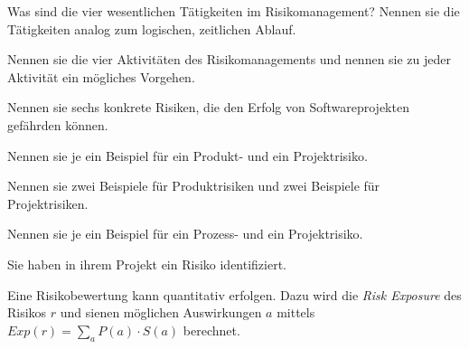 \documentclass[12pt]{exam}
\begin{document}
\begin{questions}
\question[5] Was sind die vier wesentlichen Tätigkeiten im Risikomanagement? Nennen sie die Tätigkeiten analog zum logischen, zeitlichen Ablauf.
\addpoints

\question[6] Nennen sie die vier Aktivitäten des Risikomanagements und nennen sie zu jeder Aktivität ein mögliches Vorgehen.
\addpoints

\question[3] Nennen sie sechs konkrete Risiken, die den Erfolg von Softwareprojekten gefährden können.
\addpoints

\question[2] Nennen sie je ein Beispiel für ein Produkt- und ein Projektrisiko.
\addpoints

\question[4] Nennen sie zwei Beispiele für Produktrisiken und zwei Beispiele für Projektrisiken.
\addpoints

\question[2] Nennen sie je ein Beispiel für ein Prozess- und ein Projektrisiko.
\addpoints

\question[4] Sie haben in ihrem Projekt ein Risiko identifiziert.
\noaddpoints
{}

\question[10] Eine Risikobewertung kann quantitativ erfolgen. Dazu wird die \emph{Risk Exposure} des Risikos $r$ und sienen möglichen Auswirkungen $a$ mittels $Exp(r) = \sum_aP(a) \cdot S(a)$ berechnet.
\noaddpoints
{}
\end{questions}
\end{document}
